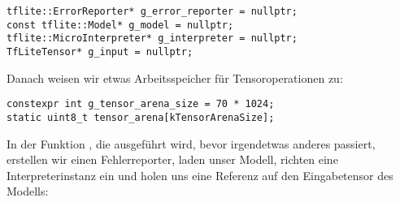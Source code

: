 \begin{code}
    \begin{lstlisting}
tflite::ErrorReporter* g_error_reporter = nullptr;
const tflite::Model* g_model = nullptr;
tflite::MicroInterpreter* g_interpreter = nullptr;
TfLiteTensor* g_input = nullptr;
  \end{lstlisting}
\end{code}

Danach weisen wir etwas Arbeitsspeicher für Tensoroperationen zu:

\begin{code}
    \begin{lstlisting}
constexpr int g_tensor_arena_size = 70 * 1024;
static uint8_t tensor_arena[kTensorArenaSize];
  \end{lstlisting}
\end{code}

In der Funktion , die ausgeführt wird, bevor irgendetwas anderes passiert, erstellen wir einen Fehlerreporter, laden unser Modell, richten eine Interpreterinstanz ein und holen uns eine Referenz auf den Eingabetensor des Modells:

